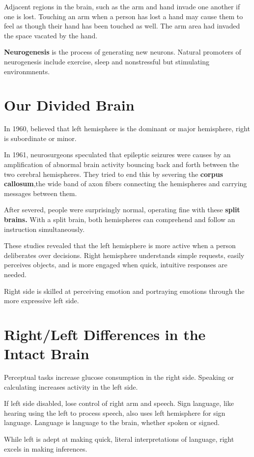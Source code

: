 Adjacent regions in the brain, such as the arm and hand invade one another if one is lost. Touching an arm when a person has lost a hand may cause them to feel as though their hand has been touched as well. The arm area had invaded the space vacated by the hand. 

\textbf{Neurogenesis} is the process of generating new neurons. Natural promoters of neurogenesis include exercise, sleep and nonstressful but stimulating environmnents.

\section*{Our Divided Brain}
In 1960, believed that left hemisphere is the dominant or major hemisphere, right is subordinate or minor. 

In 1961, neurosurgeons speculated that epileptic seizures were causes by an amplification of abnormal brain activity bouncing back and forth between the two cerebral hemispheres. They tried to end this by severing the \textbf{corpus callosum},the wide band of axon fibers connecting the hemispheres and carrying messages between them.

After severed, people were surprisingly normal, operating fine with these \textbf{split brains.} With a split brain, both hemispheres can comprehend and follow an instruction simultaneously.

These studies revealed that the left hemisphere is more active when a person deliberates over decisions. Right hemisphere understands simple requests, easily perceives objects, and is more engaged when quick, intuitive responses are needed. 

Right side is skilled at perceiving emotion and portraying emotions through the more expressive left side.  

\section*{Right/Left Differences in the Intact Brain}
Perceptual tasks increase glucose consumption in the right side. Speaking or calculating increases activity in the left side. 

If left side disabled, lose control of right arm and speech. Sign language, like hearing using the left to process speech, also uses left hemisphere for sign language. Language is language to the brain, whether spoken or signed.

While left is adept at making quick, literal interpretations of language, right excels in making inferences. 

